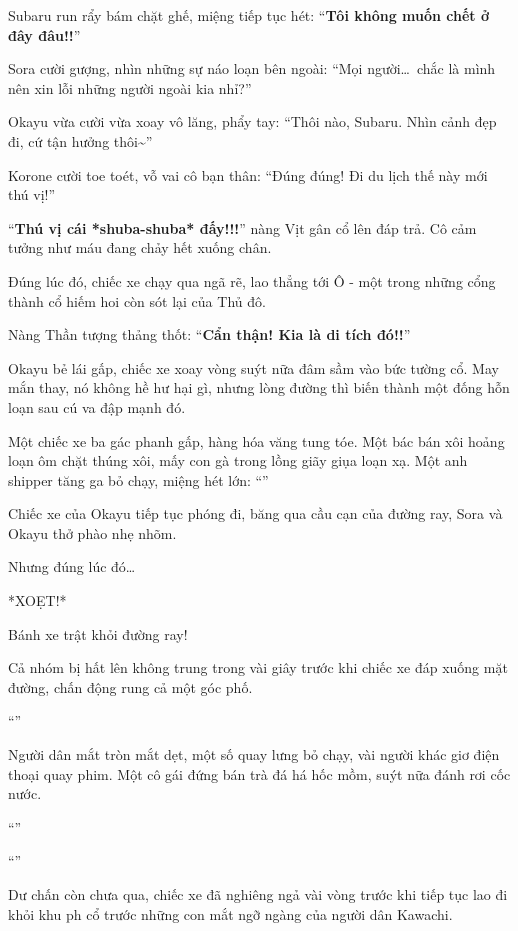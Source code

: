 \documentclass[../main.tex]{subfiles}
\begin{document}
Subaru run rẩy bám chặt ghế, miệng tiếp tục hét: ``\textbf{Tôi không muốn chết ở đây đâu!!}''

Sora cười gượng, nhìn những sự náo loạn bên ngoài: ``Mọi người\dots\ chắc là mình nên xin lỗi những người ngoài kia nhỉ?''

Okayu vừa cười vừa xoay vô lăng, phẩy tay: ``Thôi nào, Subaru. Nhìn cảnh đẹp đi, cứ tận hưởng thôi\~{}''

Korone cười toe toét, vỗ vai cô bạn thân: ``Đúng đúng! Đi du lịch thế này mới thú vị!''

``\textbf{Thú vị cái *shuba-shuba* đấy!!!}'' nàng Vịt gân cổ lên đáp trả. Cô cảm tưởng như máu đang chảy hết xuống chân.

Đúng lúc đó, chiếc xe chạy qua ngã rẽ, lao thẳng tới Ô  - một trong những cổng thành cổ hiếm hoi còn sót lại của Thủ đô.

Nàng Thần tượng thảng thốt: ``\textbf{Cẩn thận! Kia là di tích đó!!}''

Okayu bẻ lái gấp, chiếc xe xoay vòng suýt nữa đâm sầm vào bức tường cổ. May mắn thay, nó không hề hư hại gì, nhưng lòng đường thì biến thành một đống hỗn loạn sau cú va đập mạnh đó.

Một chiếc xe ba gác phanh gấp, hàng hóa văng tung tóe. Một bác bán xôi hoảng loạn ôm chặt thúng xôi, mấy con gà trong lồng giãy giụa loạn xạ. Một anh shipper tăng ga bỏ chạy, miệng hét lớn: ``''

Chiếc xe của Okayu tiếp tục phóng đi, băng qua cầu cạn của đường ray, Sora và Okayu thở phào nhẹ nhõm.

Nhưng đúng lúc đó\dots

*XOẸT!*

Bánh xe trật khỏi đường ray!

Cả nhóm bị hất lên không trung trong vài giây trước khi chiếc xe đáp xuống mặt đường, chấn động rung cả một góc phố.

``\textbf{}''

Người dân mắt tròn mắt dẹt, một số quay lưng bỏ chạy, vài người khác giơ điện thoại quay phim. Một cô gái đứng bán trà đá há hốc mồm, suýt nữa đánh rơi cốc nước.

``''

``''

Dư chấn còn chưa qua, chiếc xe đã nghiêng ngả vài vòng trước khi tiếp tục lao đi khỏi khu ph cổ trước những con mắt ngỡ ngàng của người dân Kawachi.
\end{document}
